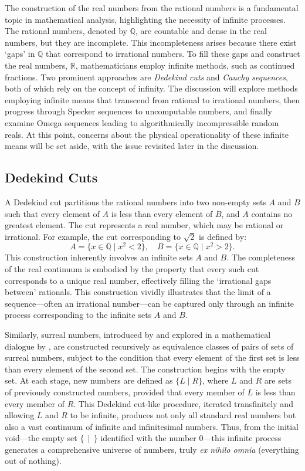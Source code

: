 \documentclass[shortAfour,sageh,times]{sagej}
\begin{document}
The construction of the real numbers from the rational numbers is a fundamental topic in mathematical analysis, highlighting the necessity of infinite processes. The rational numbers, denoted by \(\mathbb{Q}\),
are countable and dense in the real numbers, but they are incomplete. This incompleteness arises because there exist `gaps' in \(\mathbb{Q}\)
that correspond to irrational numbers. To fill these gaps and construct the real numbers, \(\mathbb{R}\), mathematicians employ infinite methods, such as continued fractions.
Two prominent approaches are \textit{Dedekind cuts} and \textit{Cauchy sequences}, both of which rely on the concept of infinity.
The discussion will explore methods employing infinite means that transcend from rational to irrational numbers, then progress through Specker sequences to uncomputable numbers, and finally examine Omega sequences leading to algorithmically incompressible random reals.
At this point, concerns about the physical operationality of these infinite means will be set aside, with the issue revisited later in the discussion.

\subsection{Dedekind Cuts}
A Dedekind cut partitions the rational numbers into two non-empty sets \(A\) and \(B\) such that every element of \(A\) is less than every element of \(B\), and \(A\) contains no greatest element. The cut represents a real number, which may be rational or irrational. For example, the cut corresponding to \(\sqrt{2}\) is defined by:
\[
A = \{ x \in \mathbb{Q} \mid x^2 < 2 \}, \quad B = \{ x \in \mathbb{Q} \mid x^2 > 2 \}.
\]
This construction inherently involves an infinite sets \(A\) and \(B\).
The completeness of the real continuum is embodied by the property that every such cut corresponds to a unique real number, effectively filling the `irrational gaps between' rationals.
This construction vividly illustrates that the limit of a
sequence---often an irrational number---can be captured only through an infinite process corresponding to the infinite sets \(A\) and \(B\).


Similarly, surreal numbers, introduced by \cite{conway-ONAG} and explored in a mathematical dialogue by \cite{knuth-surreal-numbers},
are constructed recursively as equivalence classes of pairs of sets of surreal numbers, subject to the condition that every element of the first set is less than every element of the second set.
The construction begins with the empty set. At each stage, new numbers are defined as $\{ L \mid R \}$, where $L$ and $R$ are sets of previously constructed numbers, provided that every member of $L$ is less than every member of $R$.
This Dedekind cut-like procedure, iterated transfinitely and allowing $L$ and $R$ to be infinite, produces not only all standard real numbers but also a vast continuum of infinite and infinitesimal numbers.
Thus, from the initial void---the empty set $\{\, \mid \,\}$ identified with the number $0$---this infinite process generates a comprehensive universe of numbers, truly \textit{ex nihilo omnia} (everything out of nothing).
\end{document}
